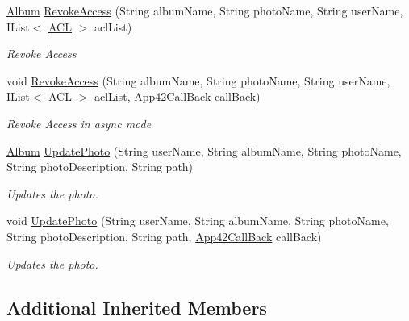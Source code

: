 \begin{DoxyCompactItemize}
\hyperlink{classcom_1_1shephertz_1_1app42_1_1paas_1_1sdk_1_1csharp_1_1gallery_1_1_album}{Album} \hyperlink{classcom_1_1shephertz_1_1app42_1_1paas_1_1sdk_1_1csharp_1_1gallery_1_1_photo_service_ac2fba480ea5f71f0fea6a432c60c7d9d}{Revoke\+Access} (String album\+Name, String photo\+Name, String user\+Name, I\+List$<$ \hyperlink{classcom_1_1shephertz_1_1app42_1_1paas_1_1sdk_1_1csharp_1_1_a_c_l}{A\+C\+L} $>$ acl\+List)
\begin{DoxyCompactList}\small\item\em Revoke Access \end{DoxyCompactList}\item 
void \hyperlink{classcom_1_1shephertz_1_1app42_1_1paas_1_1sdk_1_1csharp_1_1gallery_1_1_photo_service_adcd4da2af0d4d9aec8b0d795189f9a44}{Revoke\+Access} (String album\+Name, String photo\+Name, String user\+Name, I\+List$<$ \hyperlink{classcom_1_1shephertz_1_1app42_1_1paas_1_1sdk_1_1csharp_1_1_a_c_l}{A\+C\+L} $>$ acl\+List, \hyperlink{interfacecom_1_1shephertz_1_1app42_1_1paas_1_1sdk_1_1csharp_1_1_app42_call_back}{App42\+Call\+Back} call\+Back)
\begin{DoxyCompactList}\small\item\em Revoke Access in async mode \end{DoxyCompactList}\item 
\hyperlink{classcom_1_1shephertz_1_1app42_1_1paas_1_1sdk_1_1csharp_1_1gallery_1_1_album}{Album} \hyperlink{classcom_1_1shephertz_1_1app42_1_1paas_1_1sdk_1_1csharp_1_1gallery_1_1_photo_service_a3182c7dbd513dae71d330968091906fe}{Update\+Photo} (String user\+Name, String album\+Name, String photo\+Name, String photo\+Description, String path)
\begin{DoxyCompactList}\small\item\em Updates the photo. \end{DoxyCompactList}\item 
void \hyperlink{classcom_1_1shephertz_1_1app42_1_1paas_1_1sdk_1_1csharp_1_1gallery_1_1_photo_service_a222967ef7a7effe4f1d0e7c105a7c5c3}{Update\+Photo} (String user\+Name, String album\+Name, String photo\+Name, String photo\+Description, String path, \hyperlink{interfacecom_1_1shephertz_1_1app42_1_1paas_1_1sdk_1_1csharp_1_1_app42_call_back}{App42\+Call\+Back} call\+Back)
\begin{DoxyCompactList}\small\item\em Updates the photo. \end{DoxyCompactList}\end{DoxyCompactItemize}
\subsection*{Additional Inherited Members}


